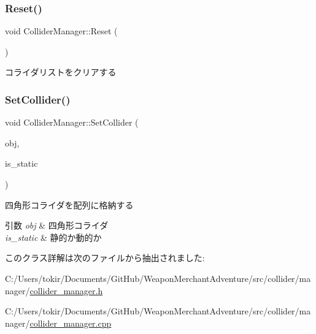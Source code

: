 \subsubsection{\texorpdfstring{Reset()}{Reset()}}
{\footnotesize\ttfamily void Collider\+Manager\+::\+Reset (\begin{DoxyParamCaption}{ }\end{DoxyParamCaption})}



コライダリストをクリアする 

\mbox{\label{class_collider_manager_acf6822be802b18cd2f0ea50b2ba00d63}} 
\subsubsection{\texorpdfstring{Set\+Collider()}{SetCollider()}}
{\footnotesize\ttfamily void Collider\+Manager\+::\+Set\+Collider (\begin{DoxyParamCaption}\item[{\mbox{\hyperlink{class_square_collider}{Square\+Collider}} $\ast$}]{obj,  }\item[{bool}]{is\+\_\+static }\end{DoxyParamCaption})}



四角形コライダを配列に格納する 


\begin{DoxyParams}{引数}
{\em obj} & 四角形コライダ \\
\hline
{\em is\+\_\+static} & 静的か動的か \\
\hline
\end{DoxyParams}


このクラス詳解は次のファイルから抽出されました\+:\begin{DoxyCompactItemize}
\item 
C\+:/\+Users/tokir/\+Documents/\+Git\+Hub/\+Weapon\+Merchant\+Adventure/src/collider/manager/\mbox{\hyperlink{collider__manager_8h}{collider\+\_\+manager.\+h}}\item 
C\+:/\+Users/tokir/\+Documents/\+Git\+Hub/\+Weapon\+Merchant\+Adventure/src/collider/manager/\mbox{\hyperlink{collider__manager_8cpp}{collider\+\_\+manager.\+cpp}}\end{DoxyCompactItemize}

